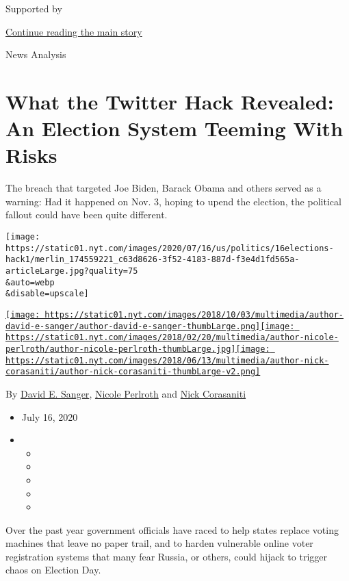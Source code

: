 Supported by

\protect\hyperlink{after-sponsor}{Continue reading the main story}

News Analysis

\hypertarget{what-the-twitter-hack-revealed-an-election-system-teeming-with-risks}{%
\section{What the Twitter Hack Revealed: An Election System Teeming With
Risks}\label{what-the-twitter-hack-revealed-an-election-system-teeming-with-risks}}

The breach that targeted Joe Biden, Barack Obama and others served as a
warning: Had it happened on Nov. 3, hoping to upend the election, the
political fallout could have been quite different.

\texttt{[image: https://static01.nyt.com/images/2020/07/16/us/politics/16elections-hack1/merlin\_174559221\_c63d8626-3f52-4183-887d-f3e4d1fd565a-articleLarge.jpg?quality=75\\\&auto=webp\\\&disable=upscale]}

\href{https://www.nytimes.com/by/david-e-sanger}{\texttt{[image: https://static01.nyt.com/images/2018/10/03/multimedia/author-david-e-sanger/author-david-e-sanger-thumbLarge.png]}}\href{https://www.nytimes.com/by/nicole-perlroth}{\texttt{[image: https://static01.nyt.com/images/2018/02/20/multimedia/author-nicole-perlroth/author-nicole-perlroth-thumbLarge.jpg]}}\href{https://www.nytimes.com/by/nick-corasaniti}{\texttt{[image: https://static01.nyt.com/images/2018/06/13/multimedia/author-nick-corasaniti/author-nick-corasaniti-thumbLarge-v2.png]}}

By \href{https://www.nytimes.com/by/david-e-sanger}{David E. Sanger},
\href{https://www.nytimes.com/by/nicole-perlroth}{Nicole Perlroth} and
\href{https://www.nytimes.com/by/nick-corasaniti}{Nick Corasaniti}

\begin{itemize}
\item
  July 16, 2020
\item
  \begin{itemize}
  \item
  \item
  \item
  \item
  \item
  \end{itemize}
\end{itemize}

Over the past year government officials have raced to help states
replace voting machines that leave no paper trail, and to harden
vulnerable online voter registration systems that many fear Russia, or
others, could hijack to trigger chaos on Election Day.


